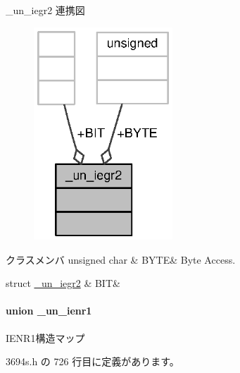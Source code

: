 \+\_\+un\+\_\+iegr2 連携図
\nopagebreak
\begin{figure}[H]
\begin{center}
\leavevmode
\includegraphics[width=148pt]{da/d51/union__un__iegr2__coll__graph}
\end{center}
\end{figure}
\begin{DoxyFields}{クラスメンバ}
unsigned char\label{3694s_8h_abbc569e9ac94762941d58877d34bc30c}
&
B\+Y\+T\+E&
Byte Access. \\
\hline

struct \hyperlink{3694s_8h_dd/dbb/struct__un__iegr2_8BIT}{\+\_\+un\+\_\+iegr2}\label{3694s_8h_a9d3fd4c1dd1ea5fa324b0212a09b2be9}
&
B\+I\+T&
\\
\hline

\end{DoxyFields}
\label{union__un__ienr1}
\paragraph{union \+\_\+un\+\_\+ienr1}
I\+E\+N\+R1構造マップ 

 3694s.\+h の 726 行目に定義があります。



